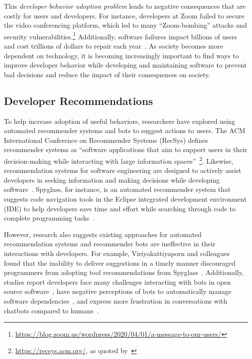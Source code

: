 This \textit{developer behavior adoption problem} leads to negative consequences that are costly for users and developers. For instance, developers at Zoom failed to secure the video conferencing platform, which led to many ``Zoom-bombing'' attacks and security vulnerabilities.\footnote{\url{https://blog.zoom.us/wordpress/2020/04/01/a-message-to-our-users/}} Additionally, software failures impact billions of users and cost trillions of dollars to repair each year~\cite{SoftwareFailWatch}. As society becomes more dependent on technology, it is becoming increasingly important to find ways to improve developer behavior while developing and maintaining software to prevent bad decisions and reduce the impact of their consequences on society.



\subsection*{Developer Recommendations}

To help increase adoption of useful behaviors, researchers have explored using automated recommender systems and bots to suggest actions to users. The ACM International Conference on Recommender Systems (RecSys) defines recommender systems as ``software applications that aim to support users in their decision-making while interacting with large information spaces''~\footnote{\url{https://recsys.acm.org/}, as quoted by~\cite{RSSE}}. 
Likewise, recommendation systems for software engineering are designed to actively assist developers in seeking information and making decisions while developing software~\cite{RSSE}. Spyglass, for instance, is an automated recommender system that suggests code navigation tools in the Eclipse integrated development environment (IDE) to help developers save time and effort while searching through code to complete programming tasks~\cite{Spyglass}. 

However, research also suggests existing approaches for automated recommendation systems and recommender bots are ineffective in their interactions with developers. For example, Viriyakattiyaporn and colleagues found that the inability to deliver suggestions in a timely manner discouraged programmers from adopting tool recommendations from Spyglass~\cite{viriyakattiyaporn2009challenges}. Additionally, studies report developers face many challenges interacting with bots in open source software~\cite{wessel2018power}, have negative perceptions of bots to automatically manage software dependencies~\cite{Samim2017AutoPullRequests}, and express more frustration in conversations with chatbots compared to humans~\cite{Hill2015Chatbots}.

